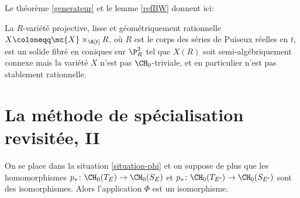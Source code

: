 Le théorème \ref{generateur} et le lemme \ref{refBW} donnent ici:

\begin{thm}\label{prop-fibres-coniques}
La $R$-variété projective, lisse et géométriquement rationnelle
$X\coloneqq \mc{X}\times_{\R[t]}R$, où $R$ est le corps des séries de Puiseux réelles en $t$, est un solide fibré en coniques sur $\P^2_R$ tel que $X(R)$ soit semi-algébriquement connexe mais la variété $X$ n'est pas $\CH_0$-triviale, et en particulier n'est pas stablement rationnelle.
\end{thm}

\section{La méthode de spécialisation revisitée, II}\label{methode-2}

\begin{lemma}\label{lemme-phi-isomorphisme-variante}
On se place dans la situation \ref{situation-phi} et on suppose de plus que les homomorphismes $p_*\colon \CH_0(T_{E})\to \CH_0(S_{E})$ et $p_*\colon \CH_0(T_{E'})\to \CH_0(S_{E'})$ sont des isomorphismes. Alors l'application $\Phi$ est un isomorphisme.
\end{lemma}

